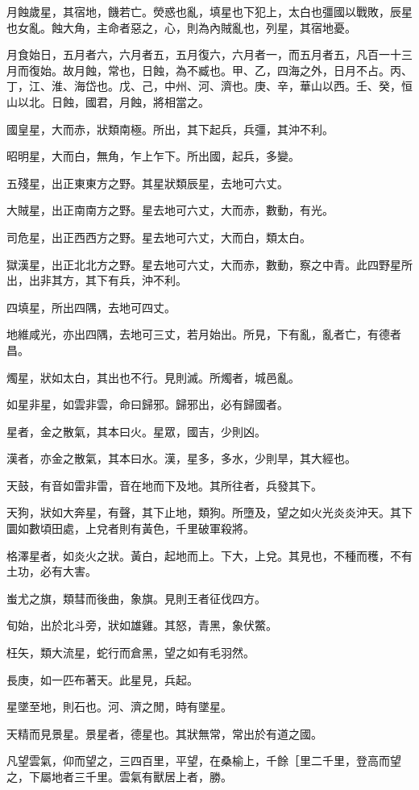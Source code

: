 月蝕歲星，其宿地，饑若亡。熒惑也亂，填星也下犯上，太白也彊國以戰敗，辰星也女亂。蝕大角，主命者惡之，心，則為內賊亂也，列星，其宿地憂。

月食始日，五月者六，六月者五，五月復六，六月者一，而五月者五，凡百一十三月而復始。故月蝕，常也，日蝕，為不臧也。甲、乙，四海之外，日月不占。丙、丁，江、淮、海岱也。戊、己，中州、河、濟也。庚、辛，華山以西。壬、癸，恒山以北。日蝕，國君，月蝕，將相當之。

國皇星，大而赤，狀類南極。所出，其下起兵，兵彊，其沖不利。

昭明星，大而白，無角，乍上乍下。所出國，起兵，多變。

五殘星，出正東東方之野。其星狀類辰星，去地可六丈。

大賊星，出正南南方之野。星去地可六丈，大而赤，數動，有光。

司危星，出正西西方之野。星去地可六丈，大而白，類太白。

獄漢星，出正北北方之野。星去地可六丈，大而赤，數動，察之中青。此四野星所出，出非其方，其下有兵，沖不利。

四填星，所出四隅，去地可四丈。

地維咸光，亦出四隅，去地可三丈，若月始出。所見，下有亂，亂者亡，有德者昌。

燭星，狀如太白，其出也不行。見則滅。所燭者，城邑亂。

如星非星，如雲非雲，命曰歸邪。歸邪出，必有歸國者。

星者，金之散氣，其本曰火。星眾，國吉，少則凶。

漢者，亦金之散氣，其本曰水。漢，星多，多水，少則旱，其大經也。

天鼓，有音如雷非雷，音在地而下及地。其所往者，兵發其下。

天狗，狀如大奔星，有聲，其下止地，類狗。所墮及，望之如火光炎炎沖天。其下圜如數頃田處，上兌者則有黃色，千里破軍殺將。

格澤星者，如炎火之狀。黃白，起地而上。下大，上兌。其見也，不種而穫，不有土功，必有大害。

蚩尤之旗，類彗而後曲，象旗。見則王者征伐四方。

旬始，出於北斗旁，狀如雄雞。其怒，青黑，象伏鱉。

枉矢，類大流星，蛇行而倉黑，望之如有毛羽然。

長庚，如一匹布著天。此星見，兵起。

星墜至地，則石也。河、濟之閒，時有墜星。

天精而見景星。景星者，德星也。其狀無常，常出於有道之國。

凡望雲氣，仰而望之，三四百里，平望，在桑榆上，千餘［里二千里，登高而望之，下屬地者三千里。雲氣有獸居上者，勝。

